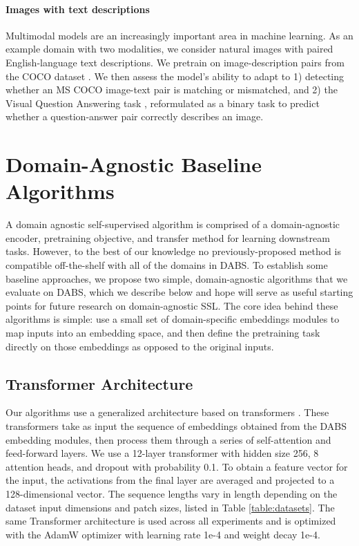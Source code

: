 \documentclass{article}
\begin{document}
\paragraph{Images with text descriptions} Multimodal models are an increasingly important area in machine learning. As an example domain with two modalities, we consider natural images with paired English-language text descriptions. We pretrain on image-description pairs from the COCO dataset \citep{Lin2014MicrosoftCC}. We then assess the model's ability to adapt to 1) detecting whether an MS COCO image-text pair is matching or mismatched, and 2) the Visual Question Answering task \citep{Agrawal2015VQAVQ}, reformulated as a binary task to predict whether a question-answer pair correctly describes an image.

\section{Domain-Agnostic Baseline Algorithms}
\label{sec:baselines}


A domain agnostic self-supervised algorithm is comprised of a domain-agnostic encoder, pretraining objective, and transfer method for learning downstream tasks. However, to the best of our knowledge no previously-proposed method is compatible off-the-shelf with all of the domains in DABS. To establish some baseline approaches, we propose two simple, domain-agnostic algorithms that we evaluate on DABS, which we describe below and hope will serve as useful starting points for future research on domain-agnostic SSL. The core idea behind these algorithms is simple: use a small set of domain-specific embeddings modules to map inputs into an embedding space, and then define the pretraining task directly on those embeddings as opposed to the original inputs.

\subsection{Transformer Architecture}
Our algorithms use a generalized architecture based on transformers \citep{Vaswani2017AttentionIA}. These transformers take as input the sequence of embeddings obtained from the DABS embedding modules, then process them through a series of self-attention and feed-forward layers. We use a 12-layer transformer with hidden size 256, 8 attention heads, and dropout with probability 0.1. To obtain a feature vector for the input, the activations from the final layer are averaged and projected to a 128-dimensional vector. The sequence lengths vary in length depending on the dataset input dimensions and patch sizes, listed in Table \ref{table:datasets}. The same Transformer architecture is used across all experiments and is optimized with the AdamW optimizer with learning rate 1e-4 and weight decay 1e-4.
\end{document}
